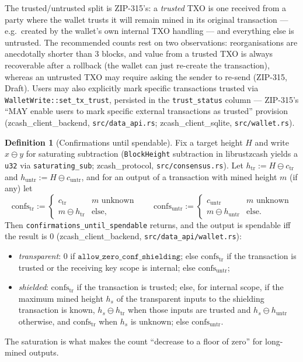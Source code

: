 \documentclass[11pt,a4paper]{article}
\theoremstyle{definition}
\newtheorem{definition}[theorem]{Definition}
\begin{document}
The trusted/untrusted split is ZIP-315's: a \emph{trusted} TXO is one
received from a party where the wallet trusts it will remain mined in its
original transaction --- e.g.\ created by the wallet's own internal TXO
handling --- and everything else is untrusted. The recommended counts rest
on two observations: reorganisations are anecdotally shorter than $3$
blocks, and value from a trusted TXO is always recoverable after a rollback
(the wallet can just re-create the transaction), whereas an untrusted TXO
may require asking the sender to re-send (ZIP-315, Draft). Users may also
explicitly mark specific transactions trusted via
\texttt{WalletWrite::set\_tx\_trust}, persisted in the
\texttt{trust\_status} column --- ZIP-315's ``MAY enable users to mark
specific external transactions as trusted'' provision
(\textsf{zcash\_client\_backend}, \texttt{src/data\_api.rs};
\textsf{zcash\_client\_sqlite}, \texttt{src/wallet.rs}).

\begin{definition}[Confirmations until spendable]\label{def:lifecycle-cus}
Fix a target height $H$ and write $x \ominus y$ for saturating subtraction
(\texttt{BlockHeight} subtraction in librustzcash yields a \texttt{u32} via
\texttt{saturating\_sub}; \textsf{zcash\_protocol},
\texttt{src/consensus.rs}). Let
$h_{\mathrm{tr}} := H \ominus c_{\mathrm{tr}}$ and
$h_{\mathrm{untr}} := H \ominus c_{\mathrm{untr}}$, and for an output of a
transaction with mined height $m$ (if any) let
\[
\mathrm{confs}_{\mathrm{tr}} :=
\begin{cases} c_{\mathrm{tr}} & m \text{ unknown} \\
  m \ominus h_{\mathrm{tr}} & \text{else}, \end{cases}
\qquad
\mathrm{confs}_{\mathrm{untr}} :=
\begin{cases} c_{\mathrm{untr}} & m \text{ unknown} \\
  m \ominus h_{\mathrm{untr}} & \text{else}. \end{cases}
\]
Then \texttt{confirmations\_until\_spendable} returns, and the output is
spendable iff the result is $0$
(\textsf{zcash\_client\_backend}, \texttt{src/data\_api/wallet.rs}):
\begin{itemize}[leftmargin=*]
\item \emph{transparent}: $0$ if $\mathtt{allow\_zero\_conf\_shielding}$;
  else $\mathrm{confs}_{\mathrm{tr}}$ if the transaction is trusted or the
  receiving key scope is internal; else $\mathrm{confs}_{\mathrm{untr}}$;
\item \emph{shielded}: $\mathrm{confs}_{\mathrm{tr}}$ if the transaction is
  trusted; else, for internal scope, if the maximum mined height $h_s$ of
  the transparent inputs to the shielding transaction is known,
  $h_s \ominus h_{\mathrm{tr}}$ when those inputs are trusted and
  $h_s \ominus h_{\mathrm{untr}}$ otherwise, and
  $\mathrm{confs}_{\mathrm{tr}}$ when $h_s$ is unknown; else
  $\mathrm{confs}_{\mathrm{untr}}$.
\end{itemize}
The saturation is what makes the count ``decrease to a floor of zero'' for
long-mined outputs.
\end{definition}
\end{document}
